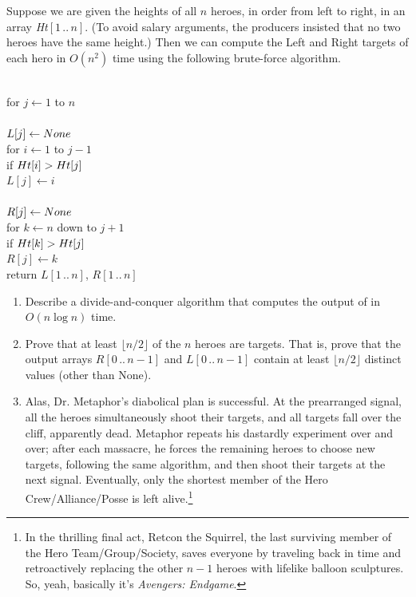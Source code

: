 \begin{exercises}
\begin{enumerate}[label=\arabic*.,ref=\thechapter.\arabic*,leftmargin=*,align=left,itemsep=1.5ex plus 0.5ex,resume]
Suppose we are given the heights of all $n$ heroes, in order from left to right, in an array \emph{Ht}$[1\,..\,n]$. (To avoid salary arguments, the producers insisted that no two heroes have the same height.) Then we can compute the Left and Right targets of each hero in $O(n^2)$ time using the following brute-force algorithm.
\begin{pseudocode}
\\
for $j \gets 1$ to $n$\\
\Indent {}\\
\Indent $L[j] \gets None$\\
\Indent for $i \gets 1$ to $j-1$\\
\Indent\Indent if $Ht[i] > Ht[j]$\\
\Indent\Indent\Indent $L[j] \gets i$\\
\Indent {}\\
\Indent $R[j] \gets None$\\
\Indent for $k \gets n$ down to $j+1$\\
\Indent\Indent if $Ht[k] > Ht[j]$\\
\Indent\Indent\Indent $R[j] \gets k$\\
return $L[1\,..\,n]$, $R[1\,..\,n]$
\end{pseudocode}
\begin{enumerate}
\item Describe a divide-and-conquer algorithm that computes the output of  in $O(n \log n)$ time.
\item Prove that at least $\lfloor n/2\rfloor$ of the $n$ heroes are targets. That is, prove that the output arrays $R[0\,..\,n - 1]$ and $L[0\,..\,n - 1]$ contain at least $\lfloor n/2\rfloor$ distinct values (other than None).
\item Alas, Dr. Metaphor’s diabolical plan is successful. At the prearranged signal, all the heroes simultaneously shoot their targets, and all targets fall over the cliff, apparently dead. Metaphor repeats his dastardly experiment over and over; after each massacre, he forces the remaining heroes to choose new targets, following the same algorithm, and then shoot their targets at the next signal. Eventually, only the shortest member of the Hero Crew/Alliance/Posse is left alive.\footnote{In the thrilling final act, Retcon the Squirrel, the last surviving member of the Hero Team/Group/Society, saves everyone by traveling back in time and retroactively replacing the other $n - 1$ heroes with lifelike balloon sculptures. So, yeah, basically it’s \emph{Avengers: Endgame}.}


\end{enumerate}
\end{enumerate}
\end{exercises}
